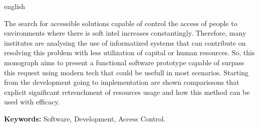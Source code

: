 \begin{resumo}[Abstract]
 \begin{otherlanguage*}{english}


The search for accessible solutions capable of control the access of people
to environments where there is soft intel increases constantingly.
Therefore, many institutes are analysing the use of informatized systems
that can contribute on resolving this problem with less utilization of capital
or human resources. So, this monograph aims to present a functional software
prototype capable of surpass this request using modern tech that could be usefull
in most scenarios. Starting from the development going to implementation are shown
comparissons that explicit significant retrenchment of resources usage and how this
method can be used with efficacy. 

\textbf{Keywords: } Software, Development, Access Control.

 \end{otherlanguage*}
\end{resumo}

